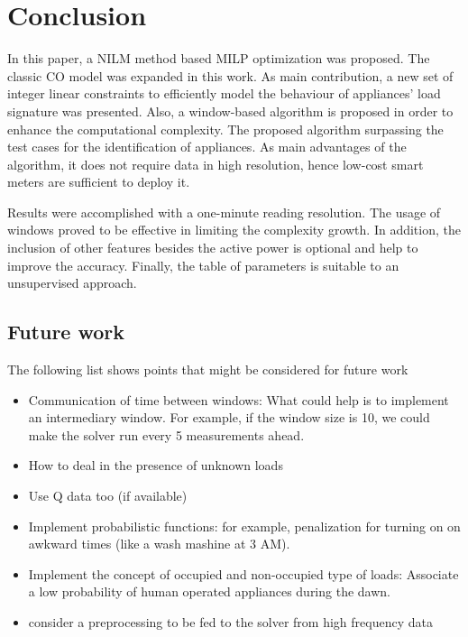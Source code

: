 
\chapter{Conclusion}
In this paper, a NILM method based MILP optimization was proposed. The classic CO model was expanded in this work. As main contribution, a new set of integer linear constraints to efficiently model the behaviour of appliances' load signature was presented. Also, a window-based algorithm is proposed in order to enhance the computational complexity. The proposed algorithm surpassing the test cases for the identification of appliances. As main advantages of the algorithm, it does not require data in high resolution, hence low-cost smart meters are sufficient to deploy it. 

Results were accomplished with a one-minute reading resolution. The usage of windows proved to be effective in limiting the complexity growth. In addition, the inclusion of other features besides the active power is optional and help to improve the accuracy. Finally, the table of parameters is suitable to an unsupervised approach. 

\section{Future work}
The following list shows points that might be considered for future work

\begin{itemize}
\item Communication of time between windows: What could help is to implement an intermediary window. For example, if the window size is 10, we could make the solver run every 5 measurements ahead. 
\item How to deal in the presence of unknown loads
\item Use Q data too (if available)
\item Implement probabilistic functions: for example, penalization for turning on on awkward times (like a wash mashine at 3 AM). 
\item Implement the concept of occupied and non-occupied type of loads: Associate a low probability of human operated appliances during the dawn. 
\item consider a preprocessing to be fed to the solver from high frequency data
\end{itemize}